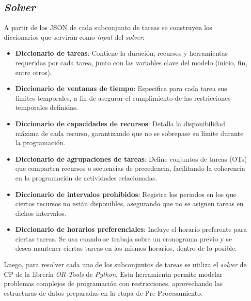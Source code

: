 \documentclass{article}
\begin{document}
\subsection{\textit{Solver}}

A partir de los JSON de cada subconjunto de tareas se construyen los diccionarios que servirán como \textit{input} del \textit{solver}:

\begin{itemize}
    \item \textbf{Diccionario de tareas}: Contiene la duración, recursos y herramientas requeridas por cada tarea, junto con las variables clave del modelo (inicio, fin, entre otros).

    \item \textbf{Diccionario de ventanas de tiempo}: Especifica para cada tarea sus límites temporales, a fin de asegurar el cumplimiento de las restricciones temporales definidas.

    \item \textbf{Diccionario de capacidades de recursos}: Detalla la disponibilidad máxima de cada recurso, garantizando que no se sobrepase su límite durante la programación.

    \item \textbf{Diccionario de agrupaciones de tareas}: Define conjuntos de tareas (OTs) que comparten recursos o secuencias de precedencia, facilitando la coherencia en la programación de actividades relacionadas.

    \item \textbf{Diccionario de intervalos prohibidos}: Registra los periodos en los que ciertos recursos no están disponibles, asegurando que no se asignen tareas en dichos intervalos.

    \item \textbf{Diccionario de horarios preferenciales}: Incluye el horario preferente para ciertas tareas. Se usa cuando se trabaja sobre un cronograma previo y se desea mantener ciertas tareas en los mismos horarios, dentro de lo posible.

\end{itemize}



Luego, para resolver cada uno de los subconjuntos de tareas se utiliza el \textit{solver} de CP de la librería \textit{OR-Tools} de \textit{Python}. Esta herramienta permite modelar problemas complejos de programación con restricciones, aprovechando las estructuras de datos preparadas en la etapa de Pre-Procesamiento.
\end{document}
